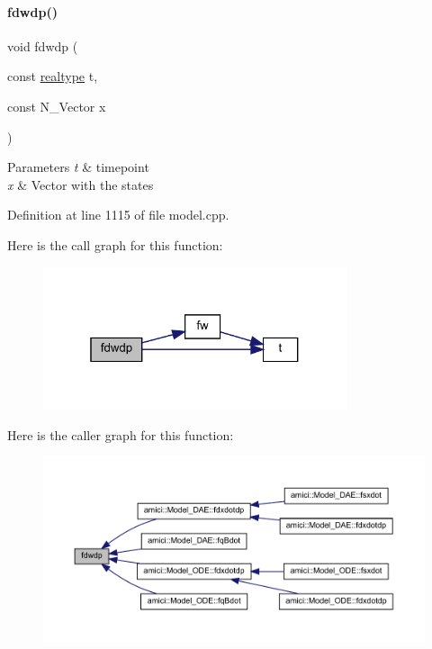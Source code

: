 \paragraph{\texorpdfstring{fdwdp()}{fdwdp()}\hspace{0.1cm}{\footnotesize\ttfamily [1/2]}}
{\footnotesize\ttfamily void fdwdp (\begin{DoxyParamCaption}\item[{const \mbox{\hyperlink{namespaceamici_a1bdce28051d6a53868f7ccbf5f2c14a3}{realtype}}}]{t,  }\item[{const N\+\_\+\+Vector}]{x }\end{DoxyParamCaption})}


\begin{DoxyParams}{Parameters}
{\em t} & timepoint \\
\hline
{\em x} & Vector with the states \\
\hline
\end{DoxyParams}


Definition at line 1115 of file model.\+cpp.

Here is the call graph for this function\+:
\nopagebreak
\begin{figure}[H]
\begin{center}
\leavevmode
\includegraphics[width=253pt]{classamici_1_1_model_abccb9631015d7f75c8afc249c9dbd002_cgraph}
\end{center}
\end{figure}
Here is the caller graph for this function\+:
\nopagebreak
\begin{figure}[H]
\begin{center}
\leavevmode
\includegraphics[width=350pt]{classamici_1_1_model_abccb9631015d7f75c8afc249c9dbd002_icgraph}
\end{center}
\end{figure}
\mbox{\label{classamici_1_1_model_abb03525327d4536166bc1e072fe34530}} 
